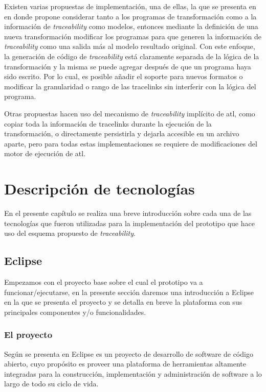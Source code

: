 \documentclass[a4paper,12pt,oneside,spanish]{book}
\begin{document}
Existen varias propuestas de implementación, una de ellas, la que se presenta en \cite{Jouault} en donde propone considerar tanto a los programas de transformación como a la información de \textit{traceability} como modelos, entonces mediante la definición de una nueva transformación modificar los programas para que generen la información de \textit{traceability} como una salida más al modelo resultado original. Con este enfoque, la generación de código de \textit{traceability} está claramente separada de la lógica de la transformación y la misma se puede agregar después de que un programa haya sido escrito. Por lo cual, es posible añadir el soporte para nuevos formatos o modificar la granularidad o rango de las tracelinks sin interferir con la lógica del programa.

Otras propuestas hacen uso del mecanismo de \textit{traceability} implícito de \gls{atl}, como copiar toda la información de tracelinks durante la ejecución de la transformación, o directamente persistirla y dejarla accesible en un archivo aparte, pero para todas estas implementaciones se requiere de modificaciones del motor de ejecución de \gls{atl}.



\chapter{Descripción de tecnologías}

En el presente capítulo se realiza una breve introducción sobre cada una de las tecnologías que fueron utilizadas para la implementación del prototipo que hace uso del esquema propuesto de \textit{traceability}.


\section{Eclipse}

Empezamos con el proyecto base sobre el cual el prototipo va a funcionar/ejecutarse, en la presente sección daremos una introducción a Eclipse en la que se presenta el proyecto y se detalla en breve la plataforma con sus principales componentes y/o funcionalidades.


\subsection{El proyecto}

Según se presenta en \cite{EMFADG, Eclipse} Eclipse es un proyecto de desarrollo de software de código abierto, cuyo propósito es proveer una plataforma de herramientas altamente integradas para la construcción, implementación y administración de software a lo largo de todo su ciclo de vida.
\end{document}
